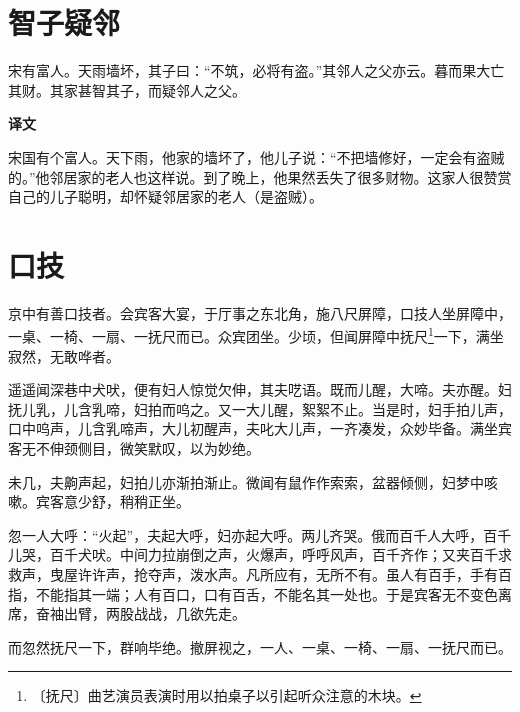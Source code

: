 \documentclass[12pt,UTF-8,openany,a4]{ctexbook}
\begin{document}
\chapter{智子疑邻}

\begin{large}
    
    宋有富人。天雨墙坏，其子曰：“不筑，必将有盗。”其邻人之父亦云。暮而果大亡其财。其家甚智其子，而疑邻人之父。
\end{large}


\newpage

\begin{Large}
    \noindent\textbf{译文}
\end{Large}


\vspace{1em}

\begin{large}
    \yiwen 
    宋国有个富人。天下雨，他家的墙坏了，他儿子说：“不把墙修好，一定会有盗贼的。”他邻居家的老人也这样说。到了晚上，他果然丢失了很多财物。这家人很赞赏自己的儿子聪明，却怀疑邻居家的老人（是盗贼）。
    
\end{large}



\chapter{口技}

\begin{large}
    
    京中有善口技者。会宾客大宴，于厅事之东北角，施八尺屏障，口技人坐屏障中，一桌、一椅、一扇、一抚尺而已。众宾团坐。少顷，但闻屏障中抚尺\footnote{〔抚尺〕\yiwen 曲艺演员表演时用以拍桌子以引起听众注意的木块。}一下，满坐寂然，无敢哗者。
    
    遥遥闻深巷中犬吠，便有妇人惊觉欠伸，其夫呓语。既而儿醒，大啼。夫亦醒。妇抚儿乳，儿含乳啼，妇拍而呜之。又一大儿醒，絮絮不止。当是时，妇手拍儿声，口中呜声，儿含乳啼声，大儿初醒声，夫叱大儿声，一齐凑发，众妙毕备。满坐宾客无不伸颈侧目，微笑默叹，以为妙绝。
    
    未几，夫齁声起，妇拍儿亦渐拍渐止。微闻有鼠作作索索，盆器倾侧，妇梦中咳嗽。宾客意少舒，稍稍正坐。
    
    忽一人大呼：“火起”，夫起大呼，妇亦起大呼。两儿齐哭。俄而百千人大呼，百千儿哭，百千犬吠。中间力拉崩倒之声，火爆声，呼呼风声，百千齐作；又夹百千求救声，曳屋许许声，抢夺声，泼水声。凡所应有，无所不有。虽人有百手，手有百指，不能指其一端；人有百口，口有百舌，不能名其一处也。于是宾客无不变色离席，奋袖出臂，两股战战，几欲先走。
    
    而忽然抚尺一下，群响毕绝。撤屏视之，一人、一桌、一椅、一扇、一抚尺而已。
\end{large}
\end{document}
